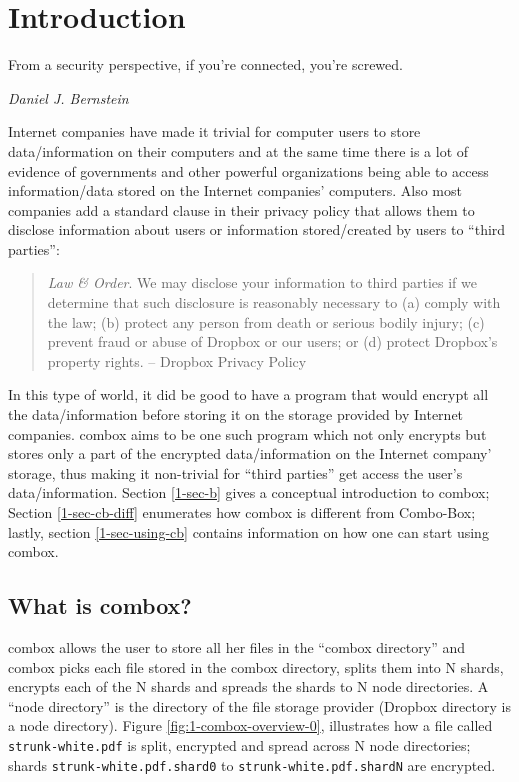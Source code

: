 \chapter{Introduction}

\epigraph{From a security perspective, if you're connected, you're
  screwed.}{\textit{Daniel J. Bernstein}}

Internet companies have made it trivial for computer users to store
data/information on their computers and at the same time there is a
lot of evidence of governments and other powerful organizations being
able to access information/data stored on the Internet companies'
computers\cite{website:wikileaks-spyfiles}. Also most companies add a
standard clause in their privacy policy that allows them to disclose
information about users or information stored/created by users to
``third parties'':

\begin{quote}
  \emph{Law \& Order}. We may disclose your information to third
  parties if we determine that such disclosure is reasonably necessary
  to (a) comply with the law; (b) protect any person from death or
  serious bodily injury; (c) prevent fraud or abuse of Dropbox or our
  users; or (d) protect Dropbox's property rights. -- Dropbox Privacy
  Policy\cite{website:dropbox-privacy}
\end{quote}

In this type of world, it did be good to have a program that would
encrypt all the data/information before storing it on the storage
provided by Internet companies. combox aims to be one such program
which not only encrypts but stores only a part of the encrypted
data/information on the Internet company' storage, thus making it
non-trivial for ``third parties'' get access the user's
data/information. Section \ref{1-sec-b} gives a conceptual
introduction to combox; Section \ref{1-sec-cb-diff} enumerates how combox
is different from Combo-Box; lastly, section \ref{1-sec-using-cb}
contains information on how one can start using combox.

\section{What is combox?}\label{1-sec-cb}

combox allows the user to store all her files in the ``combox
directory'' and combox picks each file stored in the combox directory,
splits them into N shards, encrypts each of the N shards and spreads
the shards to N node directories. A ``node directory'' is the
directory of the file storage provider (Dropbox directory is a node
directory). Figure \ref{fig:1-combox-overview-0}, illustrates how a file
called \verb+strunk-white.pdf+ is split, encrypted and spread across
N node directories; shards \verb+strunk-white.pdf.shard0+ to
\verb+strunk-white.pdf.shardN+ are encrypted.

